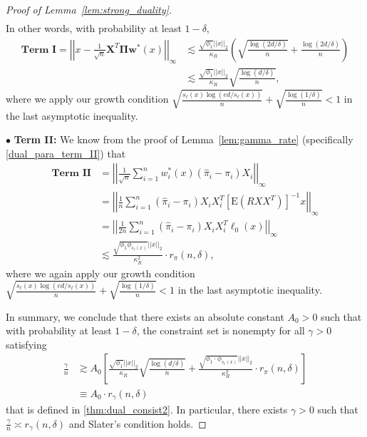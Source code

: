 \documentclass[ejsv2,noshowframe]{imsart}
\theoremstyle{plain}
\theoremstyle{definition}
\theoremstyle{remark}
\newcommand{\norm}[1]{\left|\left| #1 \right|\right|}
\renewcommand{\hat}{\widehat}
\begin{document}
\begin{proof}[Proof of Lemma~\ref{lem:strong_duality}]
\begin{align*}
	\end{align*}
	In other words, with probability at least $1-\delta$,
	\begin{align*}
		\textbf{Term I}=\norm{x - \frac{1}{\sqrt{n}} \bm{X}^T \bm{\Pi}\bm{w}^*(x)}_{\infty} &\lesssim \frac{\sqrt{\phi_1} \norm{x}_2}{\kappa_R} \left(\sqrt{\frac{\log(2d/\delta)}{n}} + \frac{\log(2d/\delta)}{n} \right)\\
		&\lesssim \frac{\sqrt{\phi_1} \norm{x}_2}{\kappa_R} \sqrt{\frac{\log(d/\delta)}{n}},
	\end{align*}
	where we apply our growth condition  $\sqrt{\frac{s_{\ell}(x)\log(ed/s_{\ell}(x))}{n}} + \sqrt{\frac{\log(1/\delta)}{n}} < 1$ in the last asymptotic inequality.
	
	\noindent $\bullet$ \textbf{Term II:} We know from the proof of Lemma~\ref{lem:gamma_rate} (specifically \eqref{dual_para_term_II}) that
	\begin{align*}
		\textbf{Term II} &= \norm{\frac{1}{\sqrt{n}} \sum_{i=1}^n w_i^*(x) \left(\hat{\pi}_i -\pi_i\right) X_i}_{\infty}\\
		&=\norm{\frac{1}{n} \sum_{i=1}^n \left(\hat{\pi}_i-\pi_i\right)X_iX_i^T\left[\mathrm{E}\left(RXX^T\right) \right]^{-1} x}_{\infty}\\
		&= \norm{\frac{1}{2n} \sum_{i=1}^n \left(\hat{\pi}_i-\pi_i\right)X_iX_i^T\ell_0(x)}_{\infty}\\
		&\lesssim \frac{\sqrt{\phi_1 \phi_{s_{\ell}(x)}}\norm{x}_2}{\kappa_R^2} \cdot  r_{\pi}(n,\delta),
	\end{align*}
	where we again apply our growth condition  $\sqrt{\frac{s_{\ell}(x)\log(ed/s_{\ell}(x))}{n}} + \sqrt{\frac{\log(1/\delta)}{n}} < 1$ in the last asymptotic inequality.
	
	In summary, we conclude that there exists an absolute constant $A_0>0$ such that with probability at least $1-\delta$, the constraint set is nonempty for all $\gamma >0$ satisfying
	\begin{align*}
		\frac{\gamma}{n} &\gtrsim A_0\left[\frac{\sqrt{\phi_1}\norm{x}_2}{\kappa_R} \sqrt{\frac{\log(d/\delta)}{n}} + \frac{\sqrt{\phi_1 \cdot \phi_{s_{\ell}(x)}}\norm{x}_2}{\kappa_R^2} \cdot r_{\pi}(n,\delta) \right]\\
		&\equiv A_0\cdot r_{\gamma}(n,\delta)
	\end{align*}
	that is defined in \autoref{thm:dual_consist2}. In particular, there exists $\gamma >0$ such that $\frac{\gamma}{n} \asymp r_{\gamma}(n,\delta)$ and Slater's condition holds.
\end{proof}
\end{document}
